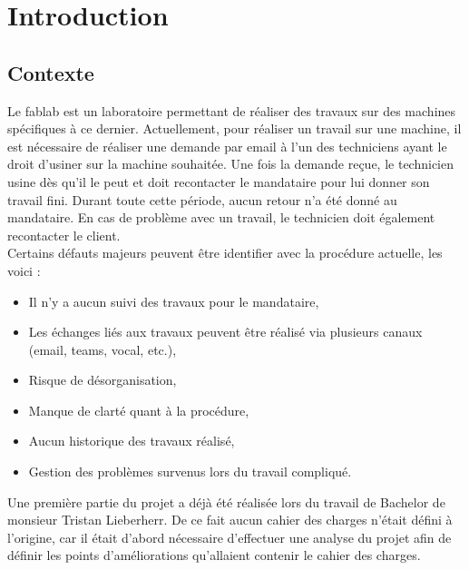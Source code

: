 \documentclass[
    iai, %
    il, %
]{heig-tb}
\begin{document}
\maketitle
\frontmatter
\clearemptydoublepage

\preamble
\authentification

\begin{abstract}
    
\end{abstract}

\clearemptydoublepage
{
    \tableofcontents
    \let\cleardoublepage\clearpage
    \listoffigures
    \let\cleardoublepage\clearpage
    \listoftables
    \let\cleardoublepage\clearpage
    \listoflistings
}

\printnomenclature
\clearemptydoublepage
{}

\mainmatter

\chapter{Introduction}

\section{Contexte}
Le \Gls{fablab} est un laboratoire permettant de réaliser des travaux sur des machines spécifiques à ce dernier. Actuellement, pour réaliser un travail sur une machine, il est nécessaire de réaliser une demande par email à l'un des techniciens ayant le droit d'usiner sur la machine souhaitée. Une fois la demande reçue, le technicien usine dès qu'il le peut et doit recontacter le mandataire pour lui donner son travail fini. Durant toute cette période, aucun retour n'a été donné au mandataire. En cas de problème avec un travail, le technicien doit également recontacter le client.\\
Certains défauts majeurs peuvent être identifier avec la procédure actuelle, les voici :
\begin{itemize}
    \item Il n'y a aucun suivi des travaux pour le mandataire, \cite{lieberherr}
    \item Les échanges liés aux travaux peuvent être réalisé via plusieurs canaux (email, \Gls{teams}, vocal, etc.), \cite{lieberherr}
    \item Risque de désorganisation, \cite{lieberherr}
    \item Manque de clarté quant à la procédure, \cite{lieberherr}
    \item Aucun historique des travaux réalisé,
    \item Gestion des problèmes survenus lors du travail compliqué.
\end{itemize}
Une première partie du projet a déjà été réalisée lors du travail de Bachelor de monsieur Tristan Lieberherr. De ce fait aucun cahier des charges n'était défini à l'origine, car il était d'abord nécessaire d'effectuer une analyse du projet afin de définir les points d'améliorations qu'allaient contenir le cahier des charges.
\end{document}
